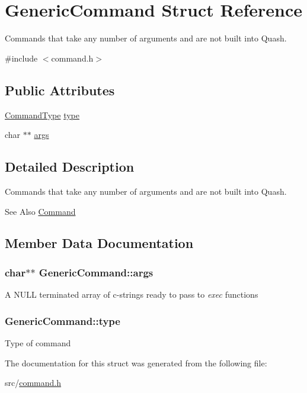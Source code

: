 \hypertarget{structGenericCommand}{\section{Generic\-Command Struct Reference}
\label{structGenericCommand}
}


Commands that take any number of arguments and are not built into Quash.  




{\ttfamily \#include $<$command.\-h$>$}

\subsection*{Public Attributes}
\begin{DoxyCompactItemize}
\item 
\hyperlink{command_8h_a21e038f5b8958e203d28bc4f18472352}{Command\-Type} \hyperlink{structGenericCommand_af50a1b4b5724e01b97f4755627de108e}{type}
\item 
char $\ast$$\ast$ \hyperlink{structGenericCommand_a0f2219278396d334144d424c02fd6389}{args}
\end{DoxyCompactItemize}


\subsection{Detailed Description}
Commands that take any number of arguments and are not built into Quash. 

\begin{DoxySeeAlso}{See Also}
\hyperlink{unionCommand}{Command} 
\end{DoxySeeAlso}


\subsection{Member Data Documentation}
\hypertarget{structGenericCommand_a0f2219278396d334144d424c02fd6389}{
\subsubsection[{args}]{\setlength{\rightskip}{0pt plus 5cm}char$\ast$$\ast$ Generic\-Command\-::args}}\label{structGenericCommand_a0f2219278396d334144d424c02fd6389}
A N\-U\-L\-L terminated array of c-\/strings ready to pass to {\itshape exec} functions \hypertarget{structGenericCommand_af50a1b4b5724e01b97f4755627de108e}{
\subsubsection[{type}]{ Generic\-Command\-::type}}\label{structGenericCommand_af50a1b4b5724e01b97f4755627de108e}
Type of command 

The documentation for this struct was generated from the following file\-:\begin{DoxyCompactItemize}
\item 
src/\hyperlink{command_8h}{command.\-h}\end{DoxyCompactItemize}
